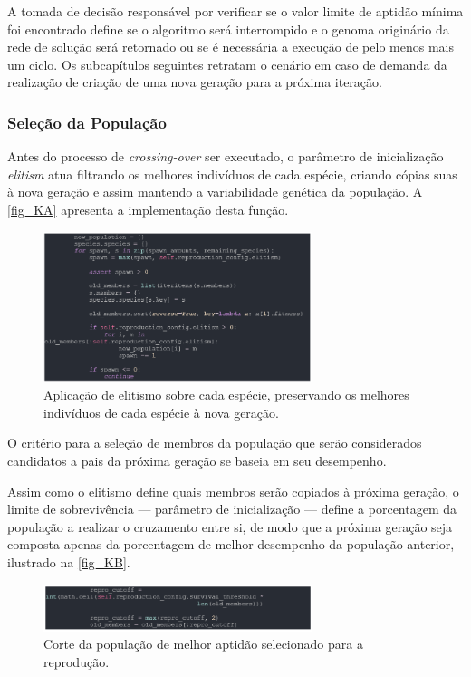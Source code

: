 A tomada de decisão responsável por verificar se o valor limite de aptidão mínima foi encontrado
define se o algoritmo será interrompido e o genoma originário da rede de solução será retornado
ou se é necessária a execução de pelo menos mais um ciclo. Os subcapítulos seguintes retratam o cenário
em caso de demanda da realização de criação de uma nova geração para a próxima iteração.

\subsubsection{Seleção da População}
Antes do processo de \textit{crossing-over} ser executado, o parâmetro de inicialização
\textit{elitism} atua filtrando os melhores indivíduos de cada espécie, criando cópias suas
à nova geração e assim mantendo a variabilidade genética da população. A \autoref{fig_KA} apresenta a implementação desta função.

\begin{figure}[htb]
        \centering
        \caption{\label{fig_KA}Aplicação de elitismo sobre cada espécie, preservando os melhores indivíduos de cada espécie à nova geração.}
        \includegraphics[width=0.7\textwidth]{images/KA.png}
\end{figure}

O critério para a seleção de membros da população que serão considerados candidatos a pais da próxima geração se baseia em seu desempenho.

Assim como o elitismo define quais membros serão copiados à próxima geração, o limite de sobrevivência
— parâmetro de inicialização — define a porcentagem da população a realizar o cruzamento entre si,
de modo que a próxima geração seja composta apenas da porcentagem de melhor desempenho da população anterior, ilustrado na \autoref{fig_KB}.

\begin{figure}[htb]
        \centering
        \caption{\label{fig_KB}Corte da população de melhor aptidão selecionado para a reprodução.}
        \includegraphics[width=0.7\textwidth]{images/KB.png}
\end{figure}

